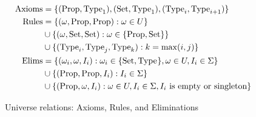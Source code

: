 \begin{figure}
\centering
\begin{align*}
\text{Axioms}
    &= \{(\text{Prop}, \text{Type}_{1}), (\text{Set}, \text{Type}_{1}), (\text{Type}_{i}, \text{Type}_{i+1})\} \\
\text{Rules}
    &= \{(\omega, \text{Prop}, \text{Prop}) : \omega \in U\} \\
    &\cup \{(\omega, \text{Set}, \text{Set}) : \omega \in \{\text{Prop}, \text{Set}\}\} \\
    &\cup \{(\text{Type}_{i}, \text{Type}_{j}, \text{Type}_{k}) : k = \max(i, j)\} \\
\text{Elims}
    &= \{(\omega_i, \omega, I_i) : \omega_i \in \{\text{Set}, \text{Type}_{}\}, \omega \in U, I_i \in \Sigma\} \\
    &\cup \{(\text{Prop}, \text{Prop}, I_i) : I_i \in \Sigma\} \\
    &\cup \{(\text{Prop}, \omega, I_i) : \omega \in U, I_i \in \Sigma, \text{$I_i$ is empty or singleton}\}
\end{align*}
\caption{Universe relations: Axioms, Rules, and Eliminations}
\label{fig:axruel}
\end{figure}